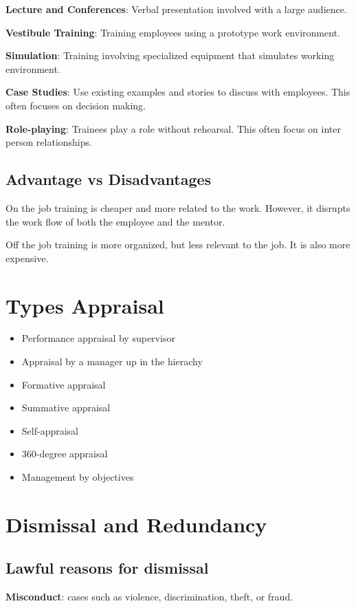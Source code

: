 \documentclass{report}
\begin{document}
\textbf{Lecture and Conferences}: Verbal presentation involved with a large audience.

\textbf{Vestibule Training}: Training employees using a prototype work environment.

\textbf{Simulation}: Training involving specialized equipment that simulates working environment.

\textbf{Case Studies}: Use existing examples and stories to discuss with employees.
This often focuses on decision making.

\textbf{Role-playing}: Trainees play a role without rehearsal. 
This often focus on inter person relationships.

\subsection{Advantage vs Disadvantages}
On the job training is cheaper and more related to the work.
However, it disrupts the work flow of both the employee and the mentor.

Off the job training is more organized, but less relevant to the job.
It is also more expensive.

\section{Types Appraisal}
\begin{itemize}
	\item Performance appraisal by supervisor
	\item Appraisal by a manager up in the hierachy
	\item Formative appraisal
	\item Summative appraisal
	\item Self-appraisal
	\item 360-degree appraisal
	\item Management by objectives
\end{itemize}

\section{Dismissal and Redundancy}

\subsection{Lawful reasons for dismissal}
\textbf{Misconduct}: cases such as violence, discrimination, theft, or fraud.
\end{document}
